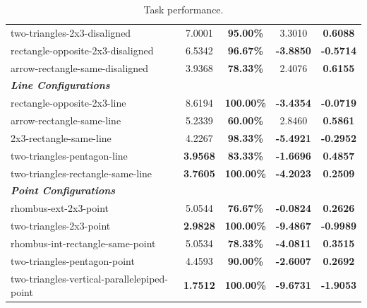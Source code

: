 \begin{table}[htbp]
{\begin{tabular}{lcccc}
two-triangles-2x3-disaligned & 7.0001 & \textbf{95.00\%} & 3.3010 & \textbf{0.6088} \\
rectangle-opposite-2x3-disaligned & 6.5342 & \textbf{96.67\%} & \textbf{-3.8850} & \textbf{-0.5714} \\
arrow-rectangle-same-disaligned & 3.9368 & \textbf{78.33\%} & 2.4076 & \textbf{0.6155} \\
\midrule
\multicolumn{5}{l}{\textit{\textbf{Line Configurations}}} \\
\midrule
rectangle-opposite-2x3-line & 8.6194 & \textbf{100.00\%} & \textbf{-3.4354} & \textbf{-0.0719} \\
arrow-rectangle-same-line & 5.2339 & \textbf{60.00\%} & 2.8460 & \textbf{0.5861} \\
2x3-rectangle-same-line & 4.2267 & \textbf{98.33\%} & \textbf{-5.4921} & \textbf{-0.2952} \\
two-triangles-pentagon-line & \textbf{3.9568} & \textbf{83.33\%} & \textbf{-1.6696} & \textbf{0.4857} \\
two-triangles-rectangle-same-line & \textbf{3.7605} & \textbf{100.00\%} & \textbf{-4.2023} & \textbf{0.2509} \\
\midrule
\multicolumn{5}{l}{\textit{\textbf{Point Configurations}}} \\
\midrule
rhombus-ext-2x3-point & 5.0544 & \textbf{76.67\%} & \textbf{-0.0824} & \textbf{0.2626} \\
two-triangles-2x3-point & \textbf{2.9828} & \textbf{100.00\%} & \textbf{-9.4867} & \textbf{-0.9989} \\
rhombus-int-rectangle-same-point & 5.0534 & \textbf{78.33\%} & \textbf{-4.0811} & \textbf{0.3515} \\
two-triangles-pentagon-point & 4.4593 & \textbf{90.00\%} & \textbf{-2.6007} & \textbf{0.2692} \\
two-triangles-vertical-parallelepiped-point & \textbf{1.7512} & \textbf{100.00\%} & \textbf{-9.6731} & \textbf{-1.9053} \\
\bottomrule
\end{tabular}}
\caption{Task performance.}
\label{tab:performance_all_configurations}
\end{table}


